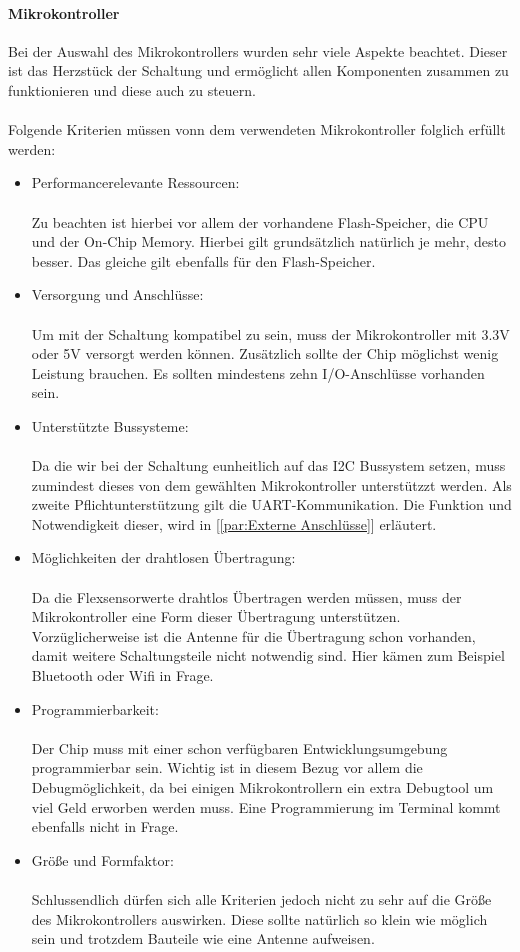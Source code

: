 \documentclass[titlepage,12pt,twoside]{article}
\begin{document}
\paragraph{Mikrokontroller}
\label{par:Mikrokontroller}
\hfill \break
\hfill \break
Bei der Auswahl des Mikrokontrollers wurden sehr viele Aspekte beachtet. Dieser ist das Herzstück der Schaltung und ermöglicht
allen Komponenten zusammen zu funktionieren und diese auch zu steuern. \\
\\
Folgende Kriterien müssen vonn dem verwendeten Mikrokontroller folglich erfüllt werden:
\begin{itemize}
	\item Performancerelevante Ressourcen: \\
		  \\
		  Zu beachten ist hierbei vor allem der vorhandene Flash-Speicher, die CPU und der On-Chip Memory. Hierbei gilt grundsätzlich 
		  natürlich je mehr, desto besser. Das gleiche gilt ebenfalls für den Flash-Speicher.
	\item Versorgung und Anschlüsse: \\
		  \\
		  Um mit der Schaltung kompatibel zu sein, muss der Mikrokontroller mit 3.3V oder 5V versorgt werden können. Zusätzlich
		  sollte der Chip möglichst wenig Leistung brauchen. Es sollten mindestens zehn I/O-Anschlüsse vorhanden sein.
	\item Unterstützte Bussysteme: \\
		  \\
		  Da die wir bei der Schaltung eunheitlich auf das I2C Bussystem setzen, muss zumindest dieses von dem gewählten Mikrokontroller
		  unterstützzt werden. Als zweite Pflichtunterstützung gilt die UART-Kommunikation. Die Funktion und Notwendigkeit dieser,
		  wird in [\textcolor{blue}{\autoref{par:Externe Anschlüsse}}] erläutert.
	\item Möglichkeiten der drahtlosen Übertragung: \\
		  \\
		  Da die Flexsensorwerte drahtlos Übertragen werden müssen, muss der Mikrokontroller eine Form dieser Übertragung unterstützen.
		  Vorzüglicherweise ist die Antenne für die Übertragung schon vorhanden, damit weitere Schaltungsteile nicht notwendig sind.
		  Hier kämen zum Beispiel Bluetooth oder Wifi in Frage.
	\item Programmierbarkeit: \\
		  \\
		  Der Chip muss mit einer schon verfügbaren Entwicklungsumgebung programmierbar sein. Wichtig ist in diesem Bezug vor allem
		  die Debugmöglichkeit, da bei einigen Mikrokontrollern ein extra Debugtool um viel Geld erworben werden muss. Eine Programmierung
		  im Terminal kommt ebenfalls nicht in Frage.
	\item Größe und Formfaktor: \\
		  \\
		  Schlussendlich dürfen sich alle Kriterien jedoch nicht zu sehr auf die Größe des Mikrokontrollers auswirken. Diese sollte
		  natürlich so klein wie möglich sein und trotzdem Bauteile wie eine Antenne aufweisen.
\end{itemize}
\end{document}
